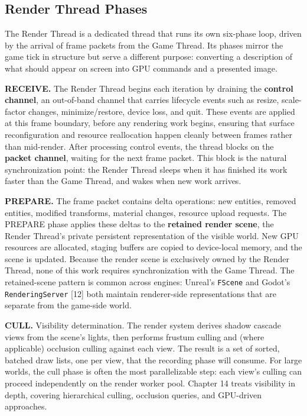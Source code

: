 \documentclass[
  11pt,
  letterpaper,
  DIV=11,
  numbers=noendperiod,
  twoside,
  open=right]{scrreprt}
\newcounter{none} %
\begin{document}
\subsection{Render Thread Phases}\label{render-thread-phases}

The Render Thread is a dedicated thread that runs its own six-phase
loop, driven by the arrival of frame packets from the Game Thread. Its
phases mirror the game tick in structure but serve a different purpose:
converting a description of what should appear on screen into GPU
commands and a presented image.

\textbf{RECEIVE.} The Render Thread begins each iteration by draining
the \textbf{control channel}, an out-of-band channel that carries
lifecycle events such as resize, scale-factor changes, minimize/restore,
device loss, and quit. These events are applied at this frame boundary,
before any rendering work begins, ensuring that surface reconfiguration
and resource reallocation happen cleanly between frames rather than
mid-render. After processing control events, the thread blocks on the
\textbf{packet channel}, waiting for the next frame packet. This block
is the natural synchronization point: the Render Thread sleeps when it
has finished its work faster than the Game Thread, and wakes when new
work arrives.

\textbf{PREPARE.} The frame packet contains delta operations: new
entities, removed entities, modified transforms, material changes,
resource upload requests. The PREPARE phase applies these deltas to the
\textbf{retained render scene}, the Render Thread's private persistent
representation of the visible world. New GPU resources are allocated,
staging buffers are copied to device-local memory, and the scene is
updated. Because the render scene is exclusively owned by the Render
Thread, none of this work requires synchronization with the Game Thread.
The retained-scene pattern is common across engines: Unreal's
\texttt{FScene} and Godot's \texttt{RenderingServer} {[}12{]} both
maintain renderer-side representations that are separate from the
game-side world.

\textbf{CULL.} Visibility determination. The render system derives
shadow cascade views from the scene's lights, then performs frustum
culling and (where applicable) occlusion culling against each view. The
result is a set of sorted, batched draw lists, one per view, that the
recording phase will consume. For large worlds, the cull phase is often
the most parallelizable step: each view's culling can proceed
independently on the render worker pool. Chapter 14 treats visibility in
depth, covering hierarchical culling, occlusion queries, and GPU-driven
approaches.
\end{document}
